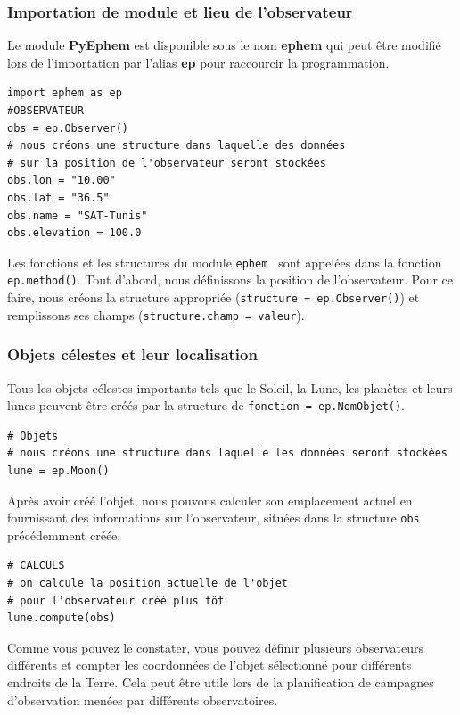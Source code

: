 \documentclass{beamer}
\begin{document}
\begin{frame}
\frametitle{Importation de module et lieu de l'observateur}

Le module \textbf{PyEphem} est disponible sous le nom \textbf{ephem} qui peut être modifié lors de l’importation par l'alias \textbf{ep} pour raccourcir la programmation.
\begin{verbatim}
import ephem as ep
#OBSERVATEUR
obs = ep.Observer()
# nous créons une structure dans laquelle des données
# sur la position de l'observateur seront stockées
obs.lon = "10.00"
obs.lat = "36.5"
obs.name = "SAT-Tunis"
obs.elevation = 100.0
\end{verbatim}
Les fonctions et les structures du module \texttt{ephem } sont appelées dans la fonction \texttt{ep.method()}. Tout d'abord, nous définissons la position de l'observateur. Pour ce faire, nous créons la structure appropriée (\texttt{structure = ep.Observer()}) et remplissons ses champs (\texttt{structure.champ = valeur}).
\end{frame}

\begin{frame}
\frametitle{Objets célestes et leur localisation}

Tous les objets célestes importants tels que le Soleil, la Lune, les planètes et leurs lunes peuvent être créés par la structure de \texttt{fonction = ep.NomObjet()}.
\begin{verbatim}
# Objets
# nous créons une structure dans laquelle les données seront stockées
lune = ep.Moon()
\end{verbatim}
Après avoir créé l'objet, nous pouvons calculer son emplacement actuel en fournissant des informations sur l'observateur, situées dans la structure \texttt{obs} précédemment créée.
\begin{verbatim}
# CALCULS
# on calcule la position actuelle de l'objet
# pour l'observateur créé plus tôt
lune.compute(obs)
\end{verbatim}
Comme vous pouvez le constater, vous pouvez définir plusieurs observateurs différents et compter les coordonnées de l'objet sélectionné pour différents endroits de la Terre. Cela peut être utile lors de la planification de campagnes d’observation menées par différents observatoires.
\end{frame}
\end{document}
